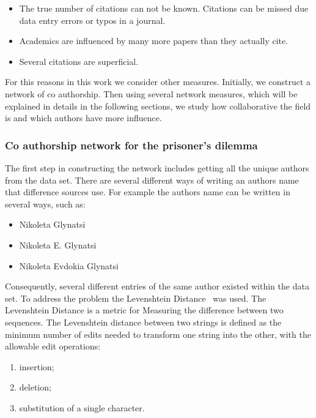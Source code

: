 \documentclass{article}
\begin{document}
\begin{itemize}
    \item The true number of citations can not be known. Citations can be missed
    due data entry errors or typos in a journal.
    \item Academics are influenced by many more papers than they actually cite.
    \item Several citations are superficial.
\end{itemize}

For this reasons in this work we consider other measures. Initially, we construct
a network of co authorship. Then using several network measures, which will be
explained in details in the following sections, we study how collaborative 
the field is and which authors have more influence.

\subsubsection{Co authorship network for the prisoner's dilemma}

The first step in constructing the network includes getting all the unique
authors from the data set. There are several different ways of writing an authors
name that difference sources use. For example the authors name can be written in
several ways, such as:

\begin{itemize}
    \item Nikoleta Glynatsi
    \item Nikoleta E. Glynatsi
    \item Nikoleta Evdokia Glynatsi
\end{itemize}

Consequently, several different entries of the same author existed within the data
set. To address the problem the Levenshtein Distance~\cite{miller2009} was used.
The Levenshtein Distance is a metric for Measuring the difference between two
sequences. The Levenshtein distance between two strings is defined as the
minimum number of edits needed to transform one string into the other, with the
allowable edit operations:

\begin{enumerate}
    \item insertion;
    \item deletion;
    \item substitution of a single character.
\end{enumerate}
\end{document}
